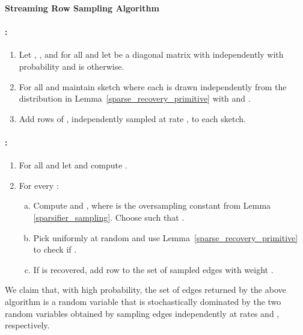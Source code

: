 \documentclass[11pt]{article}
\begin{document}
\begin{framed}{\noindent\bfseries Streaming Row Sampling Algorithm} 

\paragraph{:}
\begin{enumerate}

\item Let , , and for all  and  let  be a diagonal matrix with  independently with probability  and is  otherwise.\footnotemark
\item For all  and  maintain sketch  where each  is drawn independently from the distribution in Lemma~\ref{sparse_recovery_primitive} with  and .
\item Add rows of , independently sampled at rate  , to each sketch.

\end{enumerate}

\paragraph{:}
\begin{enumerate}
\item For all  and  let  and compute .

\item For every :
\begin{enumerate}[(a)]
\item Compute  and , where  is the oversampling constant from Lemma \ref{sparsifier_sampling}. Choose  such that .

\item Pick  uniformly at random and use Lemma~\ref{sparse_recovery_primitive} to check if .

\item If  is recovered, add row  to the set of sampled edges with weight .
\end{enumerate}

\end{enumerate}

\end{framed}


We claim that, with high probability, the set of edges returned by the above algorithm is a random variable that is stochastically dominated by the two random variables obtained by sampling edges independently at rates  and , respectively.
\end{document}

